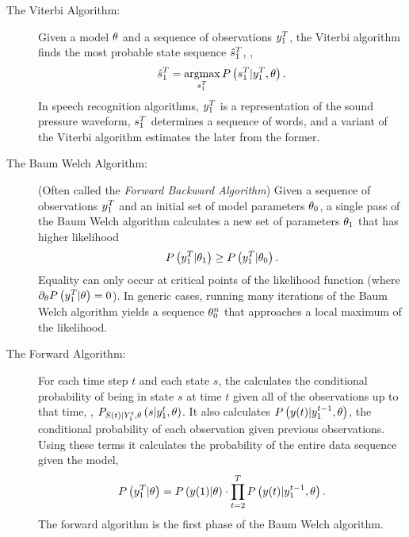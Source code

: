 \begin{description}
\item[The Viterbi Algorithm:]  Given a model
  $\theta$ and a sequence of observations $y_{1}^{T}$, the
  Viterbi algorithm finds the most probable state sequence $\hat
    s_{1}^{T}$, \ie,
  \begin{equation}
    \label{eq:intro-viterbi}
    \hat s_{1}^{T} = \operatorname*{argmax}_{s_{1}^{T}} P
    \left(s_{1}^{T}|y_{1}^{T},\theta\right).
  \end{equation}
  In speech recognition algorithms, $y_{1}^{T}$ is a representation
  of the sound pressure waveform, $s_{1}^{T}$ determines a sequence
  of words, and a variant of the Viterbi algorithm estimates the later
  from the former.
\item[The Baum Welch Algorithm:] 
  (Often
  called the \emph{Forward Backward Algorithm}) Given a sequence of
  observations $y_{1}^{T}$ and an initial set of model parameters
  $\theta_0$, a single pass of the Baum Welch algorithm
  calculates a new set of parameters $\theta_1$ that has higher
  likelihood
  \begin{equation}
    \label{eq:intro-fba}
    P\left( y_{1}^{T}|\theta_1 \right) \geq
    P\left( y_{1}^{T}|\theta_0 \right).
  \end{equation}
  Equality can only occur at critical points of the likelihood
  function (where $\partial_\theta P\left(
    y_{1}^{T}|\theta \right) = 0$).  In generic cases,
running many iterations of the Baum Welch algorithm yields a sequence
$\theta_{0}^{n}$ that approaches a local maximum of the
likelihood.
\item[The Forward Algorithm:] For each time step $t$ and each state
  $s$, the  calculates the conditional
  probability of being in state $s$ at time $t$ given all of the
  observations up to that time, \ie,
  $P_{{S}{(t)}|Y_{1}^{t},\theta} \left(s|y_{1}^{t},
    \theta \right)$. It also calculates
  $P\left({y}{(t)}|y_{1}^{t-1}, \theta \right)$, the
  conditional probability of each observation given previous
  observations.  Using these terms it calculates the probability of
  the entire data sequence given the model,
  \begin{equation*}
    P \left(y_{1}^{T}|\theta \right) =  P \left({y}{(1)}
      |\theta \right) \cdot  \prod_{t=2}^T P
    \left({y}{(t)}|y_{1}^{t-1}, \theta \right).
  \end{equation*}
  The forward algorithm is the first phase of the Baum Welch algorithm.
\end{description}

